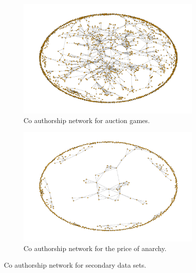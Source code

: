 \documentclass{article}
\theoremstyle{definition}
\begin{document}
\begin{center}
    \begin{figure}[!hbtp]
        \begin{subfigure}{0.5\textwidth}
            \includegraphics[width=\textwidth]{./assets/images/co-authors-network-auction.pdf}
            \caption{Co authorship network for auction games.}
        \end{subfigure}
        \begin{subfigure}{0.5\textwidth}
            \includegraphics[width=\textwidth]{./assets/images/co-authors-network-price.pdf}
            \caption{Co authorship network for the price of anarchy.}
        \end{subfigure}
    \caption{Co authorship network for secondary data sets.}
    \label{fig:co-authorship-other-topics}
    \end{figure}
    \end{center}
\end{document}
